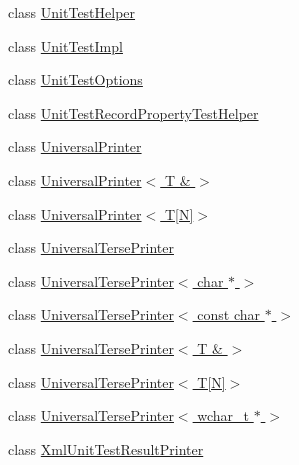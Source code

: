 \begin{DoxyCompactItemize}
\item 
class \hyperlink{classtesting_1_1internal_1_1_unit_test_helper}{Unit\+Test\+Helper}
\item 
class \hyperlink{classtesting_1_1internal_1_1_unit_test_impl}{Unit\+Test\+Impl}
\item 
class \hyperlink{classtesting_1_1internal_1_1_unit_test_options}{Unit\+Test\+Options}
\item 
class \hyperlink{classtesting_1_1internal_1_1_unit_test_record_property_test_helper}{Unit\+Test\+Record\+Property\+Test\+Helper}
\item 
class \hyperlink{classtesting_1_1internal_1_1_universal_printer}{Universal\+Printer}
\item 
class \hyperlink{classtesting_1_1internal_1_1_universal_printer_3_01_t_01_6_01_4}{Universal\+Printer$<$ T \& $>$}
\item 
class \hyperlink{classtesting_1_1internal_1_1_universal_printer_3_01_t[_n]_4}{Universal\+Printer$<$ T\mbox{[}\+N\mbox{]}$>$}
\item 
class \hyperlink{classtesting_1_1internal_1_1_universal_terse_printer}{Universal\+Terse\+Printer}
\item 
class \hyperlink{classtesting_1_1internal_1_1_universal_terse_printer_3_01char_01_5_01_4}{Universal\+Terse\+Printer$<$ char $\ast$ $>$}
\item 
class \hyperlink{classtesting_1_1internal_1_1_universal_terse_printer_3_01const_01char_01_5_01_4}{Universal\+Terse\+Printer$<$ const char $\ast$ $>$}
\item 
class \hyperlink{classtesting_1_1internal_1_1_universal_terse_printer_3_01_t_01_6_01_4}{Universal\+Terse\+Printer$<$ T \& $>$}
\item 
class \hyperlink{classtesting_1_1internal_1_1_universal_terse_printer_3_01_t[_n]_4}{Universal\+Terse\+Printer$<$ T\mbox{[}\+N\mbox{]}$>$}
\item 
class \hyperlink{classtesting_1_1internal_1_1_universal_terse_printer_3_01wchar__t_01_5_01_4}{Universal\+Terse\+Printer$<$ wchar\+\_\+t $\ast$ $>$}
\item 
class \hyperlink{classtesting_1_1internal_1_1_xml_unit_test_result_printer}{Xml\+Unit\+Test\+Result\+Printer}
\end{DoxyCompactItemize}
